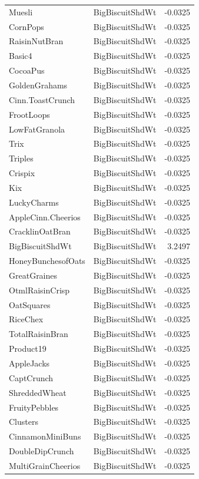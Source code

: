 \begin{longtable}{llr}
Muesli & BigBiscuitShdWt & -0.0325 \\
CornPops & BigBiscuitShdWt & -0.0325 \\
RaisinNutBran & BigBiscuitShdWt & -0.0325 \\
Basic4 & BigBiscuitShdWt & -0.0325 \\
CocoaPus & BigBiscuitShdWt & -0.0325 \\
GoldenGrahams & BigBiscuitShdWt & -0.0325 \\
Cinn.ToastCrunch & BigBiscuitShdWt & -0.0325 \\
FrootLoops & BigBiscuitShdWt & -0.0325 \\
LowFatGranola & BigBiscuitShdWt & -0.0325 \\
Trix & BigBiscuitShdWt & -0.0325 \\
Triples & BigBiscuitShdWt & -0.0325 \\
Crispix & BigBiscuitShdWt & -0.0325 \\
Kix & BigBiscuitShdWt & -0.0325 \\
LuckyCharms & BigBiscuitShdWt & -0.0325 \\
AppleCinn.Cheerios & BigBiscuitShdWt & -0.0325 \\
CracklinOatBran & BigBiscuitShdWt & -0.0325 \\
BigBiscuitShdWt & BigBiscuitShdWt & 3.2497 \\
HoneyBunchesofOats & BigBiscuitShdWt & -0.0325 \\
GreatGraines & BigBiscuitShdWt & -0.0325 \\
OtmlRaisinCrisp & BigBiscuitShdWt & -0.0325 \\
OatSquares & BigBiscuitShdWt & -0.0325 \\
RiceChex & BigBiscuitShdWt & -0.0325 \\
TotalRaisinBran & BigBiscuitShdWt & -0.0325 \\
Product19 & BigBiscuitShdWt & -0.0325 \\
AppleJacks & BigBiscuitShdWt & -0.0325 \\
CaptCrunch & BigBiscuitShdWt & -0.0325 \\
ShreddedWheat & BigBiscuitShdWt & -0.0325 \\
FruityPebbles & BigBiscuitShdWt & -0.0325 \\
Clusters & BigBiscuitShdWt & -0.0325 \\
CinnamonMiniBuns & BigBiscuitShdWt & -0.0325 \\
DoubleDipCrunch & BigBiscuitShdWt & -0.0325 \\
MultiGrainCheerios & BigBiscuitShdWt & -0.0325 \\

\end{longtable}
